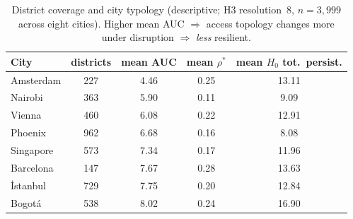 \documentclass[sn-mathphys-num,pdflatex]{sn-jnl}
\newcommand{\rhostar}{\rho^{*}}
\begin{document}
\begin{table}[t]\centering
\caption{District coverage and city typology (descriptive; H3 resolution~8,
$n=3{,}999$ across eight cities). Higher mean AUC $\Rightarrow$ access topology
changes more under disruption $\Rightarrow$ \emph{less} resilient.}
\label{tab:typology}
\begin{tabular}{lcccc}
\toprule
City & districts & mean AUC & mean $\rhostar$ & mean $H_0$ tot.\ persist.\\
\midrule
Amsterdam & 227 & 4.46 & 0.25 & 13.11\\
Nairobi   & 363 & 5.90 & 0.11 & 9.09\\
Vienna    & 460 & 6.08 & 0.22 & 12.91\\
Phoenix   & 962 & 6.68 & 0.16 & 8.08\\
Singapore & 573 & 7.34 & 0.17 & 11.96\\
Barcelona & 147 & 7.67 & 0.28 & 13.63\\
İstanbul  & 729 & 7.75 & 0.20 & 12.84\\
Bogotá    & 538 & 8.02 & 0.24 & 16.90\\
\bottomrule
\end{tabular}
\end{table}
\end{document}
